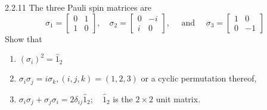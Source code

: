 \newpage

\begin{mybox}{2.2.11}
The three Pauli spin matrices are
$$
\sigma_{1}=\begin{bmatrix}{0} & {1} \\ {1} & {0}\end{bmatrix}, \quad \sigma_{2}=\begin{bmatrix}{0} & {-i} \\ {i} & {0}\end{bmatrix}, \quad \text { and } \quad \sigma_{3}=\begin{bmatrix}{1} & {0} \\ {0} & {-1}\end{bmatrix}
$$
Show that

\begin{enumerate}[$(a)$]
\item $\left(\sigma_{i}\right)^{2}=\hat{1}_{2}$
\item $\sigma_{i} \sigma_{j}=i \sigma_{k},(i, j, k)=(1,2,3)$ or a cyclic permutation thereof,
\item $\sigma_{i} \sigma_{j}+\sigma_{j} \sigma_{i}=2 \delta_{i j} \hat{1}_{2} ; \quad \hat{1}_{2}$ is the $2 \times 2$ unit matrix.
\end{enumerate}
\end{mybox}

